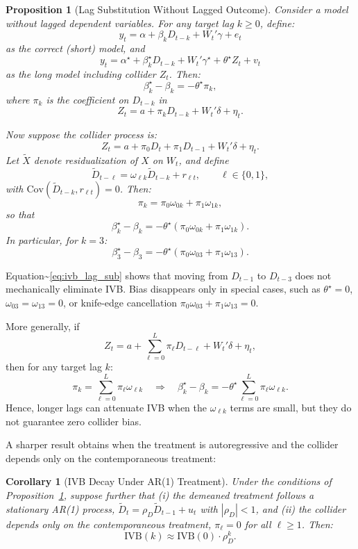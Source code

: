 \documentclass[
]{article}
\newtheorem{proposition}{Proposition}
\newtheorem{corollary}{Corollary}
\begin{document}
\begin{proposition}[Lag Substitution Without Lagged Outcome]
\label{prop:ivb_lag_sub}
Consider a model without lagged dependent variables. For any target lag $k \geq 0$, define:
\[
y_t = \alpha + \beta_k D_{t-k} + W_t'\gamma + e_t
\]
as the correct (short) model, and
\[
y_t = \alpha^{\star} + \beta_k^{\star} D_{t-k} + W_t'\gamma^{\star} + \theta^{\star} Z_t + v_t
\]
as the long model including collider $Z_t$. Then:
\[
\beta_k^{\star} - \beta_k = -\theta^{\star}\pi_k,
\]
where $\pi_k$ is the coefficient on $D_{t-k}$ in
\[
Z_t = a + \pi_k D_{t-k} + W_t'\delta + \eta_t.
\]

Now suppose the collider process is:
\[
Z_t = a + \pi_0 D_t + \pi_1 D_{t-1} + W_t'\delta + \eta_t.
\]
Let $\widetilde{X}$ denote residualization of $X$ on $W_t$, and define
\[
\widetilde{D}_{t-\ell} = \omega_{\ell k}\widetilde{D}_{t-k} + r_{\ell t}, \qquad \ell \in \{0,1\},
\]
with $\mathrm{Cov}(\widetilde{D}_{t-k}, r_{\ell t}) = 0$. Then:
\[
\pi_k = \pi_0 \omega_{0k} + \pi_1 \omega_{1k},
\]
so that
\begin{equation}
\beta_k^{\star} - \beta_k = -\theta^{\star}\left(\pi_0 \omega_{0k} + \pi_1 \omega_{1k}\right).
\label{eq:ivb_lag_sub}
\end{equation}
In particular, for $k=3$:
\[
\beta_3^{\star} - \beta_3 = -\theta^{\star}\left(\pi_0 \omega_{03} + \pi_1 \omega_{13}\right).
\]
\end{proposition}

Equation\textasciitilde{}\eqref{eq:ivb_lag_sub} shows that moving from
\(D_{t-1}\) to \(D_{t-3}\) does not mechanically eliminate IVB. Bias
disappears only in special cases, such as \(\theta^{\star}=0\),
\(\omega_{03}=\omega_{13}=0\), or knife-edge cancellation
\(\pi_0 \omega_{03} + \pi_1 \omega_{13}=0\).

More generally, if \[
Z_t = a + \sum_{\ell=0}^{L}\pi_{\ell} D_{t-\ell} + W_t'\delta + \eta_t,
\] then for any target lag \(k\): \[
\pi_k = \sum_{\ell=0}^{L}\pi_{\ell}\omega_{\ell k}
\quad\Rightarrow\quad
\beta_k^{\star} - \beta_k = -\theta^{\star}\sum_{\ell=0}^{L}\pi_{\ell}\omega_{\ell k}.
\] Hence, longer lags can attenuate IVB when the \(\omega_{\ell k}\)
terms are small, but they do not guarantee zero collider bias.

A sharper result obtains when the treatment is autoregressive and the
collider depends only on the contemporaneous treatment:

\begin{corollary}[IVB Decay Under AR(1) Treatment]
\label{cor:ivb_decay}
Under the conditions of Proposition~\ref{prop:ivb_lag_sub}, suppose further that (i) the demeaned treatment follows a stationary AR(1) process, $\widetilde{D}_t = \rho_D \widetilde{D}_{t-1} + u_t$ with $|\rho_D| < 1$, and (ii) the collider depends only on the contemporaneous treatment, $\pi_\ell = 0$ for all $\ell \geq 1$. Then:
\[
\text{IVB}(k) \approx \text{IVB}(0) \cdot \rho_D^k.
\]
\end{corollary}
\end{document}
